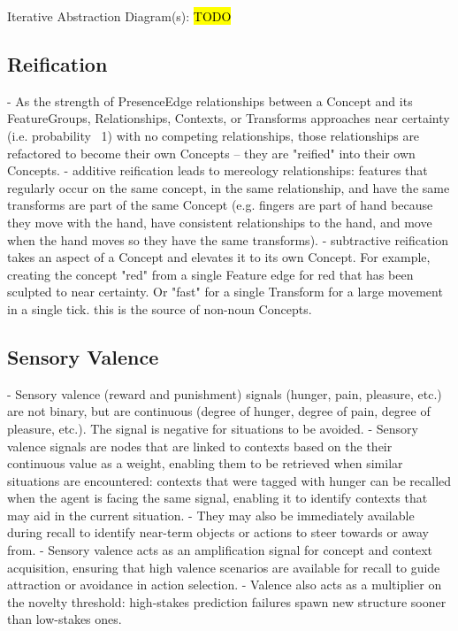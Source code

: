 \documentclass{article}
\begin{document}
Iterative Abstraction Diagram(s): \hl{TODO}

\subsection{Reification}
- As the strength of PresenceEdge relationships between a Concept and its FeatureGroups, Relationships, Contexts, or Transforms approaches near certainty (i.e. probability ~1) with no competing relationships, those relationships are refactored to become their own Concepts -- they are "reified" into their own Concepts.
- additive reification leads to mereology relationships: features that regularly occur on the same concept, in the same relationship, and have the same transforms are part of the same Concept (e.g. fingers are part of hand because they move with the hand, have consistent relationships to the hand, and move when the hand moves so they have the same transforms).
- subtractive reification takes an aspect of a Concept and elevates it to its own Concept. For example, creating the concept "red" from a single Feature edge for red that has been sculpted to near certainty. Or "fast" for a single Transform for a large movement in a single tick. this is the source of non-noun Concepts.

\subsection{Sensory Valence}
- Sensory valence (reward and punishment) signals (hunger, pain, pleasure, etc.) are not binary, but are continuous (degree of hunger, degree of pain, degree of pleasure, etc.). The signal is negative for situations to be avoided.
- Sensory valence signals are nodes that are linked to contexts based on the their continuous value as a weight, enabling them to be retrieved when similar situations are encountered: contexts that were tagged with hunger can be recalled when the agent is facing the same signal, enabling it to identify contexts that may aid in the current situation.
- They may also be immediately available during recall to identify near-term objects or actions to steer towards or away from.
- Sensory valence acts as an amplification signal for concept and context acquisition, ensuring that high valence scenarios are available for recall to guide attraction or avoidance in action selection.
- Valence also acts as a multiplier on the novelty threshold: high-stakes prediction failures spawn new structure sooner than low-stakes ones.
\end{document}
